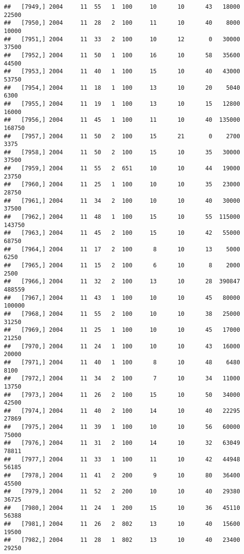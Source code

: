 \documentclass{article}\usepackage[]{graphicx}\usepackage[]{color}
\makeatletter
\newenvironment{kframe}{%
 \def\at@end@of@kframe{}%
 \ifinner\ifhmode%
  \def\at@end@of@kframe{\end{minipage}}%
  \begin{minipage}{\columnwidth}%
 \fi\fi%
 \def\FrameCommand##1{\hskip\@totalleftmargin \hskip-\fboxsep
 \colorbox{shadecolor}{##1}\hskip-\fboxsep
     \hskip-\linewidth \hskip-\@totalleftmargin \hskip\columnwidth}%
 \MakeFramed {\advance\hsize-\width
   \@totalleftmargin\z@ \linewidth\hsize
   \@setminipage}}%
 {\par\unskip\endMakeFramed%
 \at@end@of@kframe}
\newenvironment{knitrout}{}{} %
\makeatother
\begin{document}
\begin{knitrout}
\begin{kframe}
\begin{verbatim}
##   [7949,] 2004     11  55   1  100     10      10      43   18000   22500
##   [7950,] 2004     11  28   2  100     11      10      40    8000   10000
##   [7951,] 2004     11  33   2  100     10      12       0   30000   37500
##   [7952,] 2004     11  50   1  100     16      10      58   35600   44500
##   [7953,] 2004     11  40   1  100     15      10      40   43000   53750
##   [7954,] 2004     11  18   1  100     13      10      20    5040    6300
##   [7955,] 2004     11  19   1  100     13      10      15   12800   16000
##   [7956,] 2004     11  45   1  100     11      10      40  135000  168750
##   [7957,] 2004     11  50   2  100     15      21       0    2700    3375
##   [7958,] 2004     11  50   2  100     15      10      35   30000   37500
##   [7959,] 2004     11  55   2  651     10      10      44   19000   23750
##   [7960,] 2004     11  25   1  100     10      10      35   23000   28750
##   [7961,] 2004     11  34   2  100     10      10      40   30000   37500
##   [7962,] 2004     11  48   1  100     15      10      55  115000  143750
##   [7963,] 2004     11  45   2  100     15      10      42   55000   68750
##   [7964,] 2004     11  17   2  100      8      10      13    5000    6250
##   [7965,] 2004     11  15   2  100      6      10       8    2000    2500
##   [7966,] 2004     11  32   2  100     13      10      28  390847  488559
##   [7967,] 2004     11  43   1  100     10      10      45   80000  100000
##   [7968,] 2004     11  55   2  100     10      10      38   25000   31250
##   [7969,] 2004     11  25   1  100     10      10      45   17000   21250
##   [7970,] 2004     11  24   1  100     10      10      43   16000   20000
##   [7971,] 2004     11  40   1  100      8      10      48    6480    8100
##   [7972,] 2004     11  34   2  100      7      10      34   11000   13750
##   [7973,] 2004     11  26   2  100     15      10      50   34000   42500
##   [7974,] 2004     11  40   2  100     14      10      40   22295   27869
##   [7975,] 2004     11  39   1  100     10      10      56   60000   75000
##   [7976,] 2004     11  31   2  100     14      10      32   63049   78811
##   [7977,] 2004     11  33   1  100     11      10      42   44948   56185
##   [7978,] 2004     11  41   2  200      9      10      80   36400   45500
##   [7979,] 2004     11  52   2  200     10      10      40   29380   36725
##   [7980,] 2004     11  24   1  200     15      10      36   45110   56388
##   [7981,] 2004     11  26   2  802     13      10      40   15600   19500
##   [7982,] 2004     11  28   1  802     13      10      40   23400   29250

\end{verbatim}
\end{kframe}
\end{knitrout}
\end{document}
